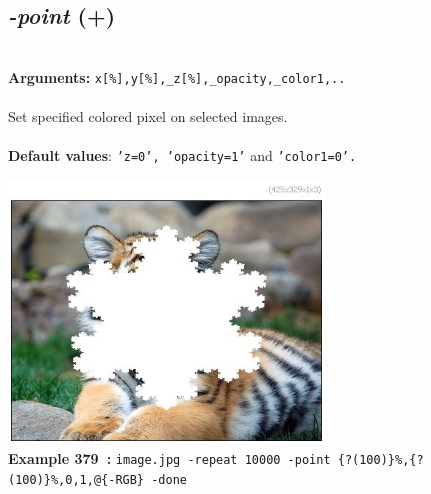 \documentclass[a4paper,11pt,twoside]{book}
\begin{document}
\subsection{\emph{-point} (+)}\vspace*{-0.5em}
~\\\textbf{Arguments: } 
{\small \texttt{x[\%],y[\%],\_z[\%],\_opacity,\_color1,..}}\\~\\
Set specified colored pixel on selected images.
~\\~\\\textbf{Default values}: {\small \texttt{'z=0', 'opacity=1'} and \texttt{'color1=0'.}}
\begin{center}\includegraphics[keepaspectratio=true,height=7cm,width=\textwidth]{img/gmic_def379.jpg}\\
{\footnotesize \textbf{Example 379~:} \texttt{image.jpg -repeat 10000 -point \{?(100)\}\%,\{?(100)\}\%,0,1,@\{-RGB\} -done}}
\end{center}
\end{document}
